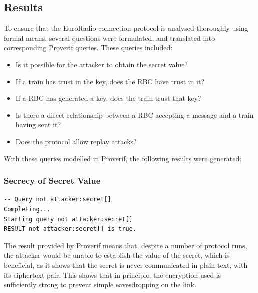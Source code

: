 \documentclass[twoside,11pt,a4paper]{article}
\begin{document}
\subsection{Results}
To ensure that the EuroRadio connection protocol is analysed thoroughly using formal means, several questions were formulated, and translated into corresponding Proverif queries. These queries included:
\begin{itemize}[nolistsep]
\item Is it possible for the attacker to obtain the secret value?
\item If a train has trust in the key, does the RBC have trust in it?
\item If a RBC has generated a key, does the train trust that key?
\item Is there a direct relationship between a RBC accepting a message and a train having sent it?
\item Does the protocol allow replay attacks?
\end{itemize}

With these queries modelled in Proverif, the following results were generated:
\subsubsection{Secrecy of Secret Value}
\begin{verbatim}
-- Query not attacker:secret[]
Completing...
Starting query not attacker:secret[]
RESULT not attacker:secret[] is true.
\end{verbatim}
The result provided by Proverif means that, despite a number of protocol runs, the attacker would be unable to establish the value of the secret, which is beneficial, as it shows that the secret is never communicated in plain text, with its ciphertext pair. This shows that in principle, the encryption used is sufficiently strong to prevent simple eavesdropping on the link.
\end{document}
